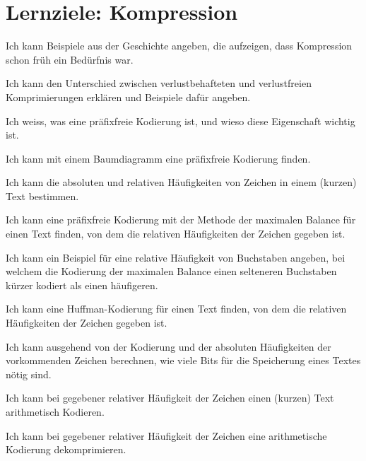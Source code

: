 \section*{Lernziele: Kompression}
\begin{todolist}
\item Ich kann Beispiele aus der Geschichte angeben, die aufzeigen, dass Kompression schon früh ein Bedürfnis war.
\item Ich kann den Unterschied zwischen verlustbehafteten und verlustfreien Komprimierungen erklären und Beispiele dafür angeben.
\item Ich weiss, was eine präfixfreie Kodierung ist, und wieso diese Eigenschaft wichtig ist.
\item Ich kann mit einem Baumdiagramm eine präfixfreie Kodierung finden.
\item Ich kann die absoluten und relativen Häufigkeiten von Zeichen in einem (kurzen) Text bestimmen.
\item Ich kann eine präfixfreie Kodierung mit der Methode der maximalen Balance für einen Text finden, von dem die relativen Häufigkeiten der Zeichen gegeben ist.
\item Ich kann ein Beispiel für eine relative Häufigkeit von Buchstaben angeben, bei welchem die Kodierung der maximalen Balance einen selteneren Buchstaben kürzer kodiert als einen häufigeren.
\item Ich kann eine Huffman-Kodierung für einen Text finden, von dem die relativen Häufigkeiten der Zeichen gegeben ist.
\item Ich kann ausgehend von der Kodierung und der absoluten Häufigkeiten der vorkommenden Zeichen berechnen, wie viele Bits für die Speicherung eines Textes nötig sind.
\item Ich kann bei gegebener relativer Häufigkeit der Zeichen einen (kurzen) Text arithmetisch Kodieren.
\item Ich kann bei gegebener relativer Häufigkeit der Zeichen eine arithmetische Kodierung dekomprimieren.
\end{todolist}